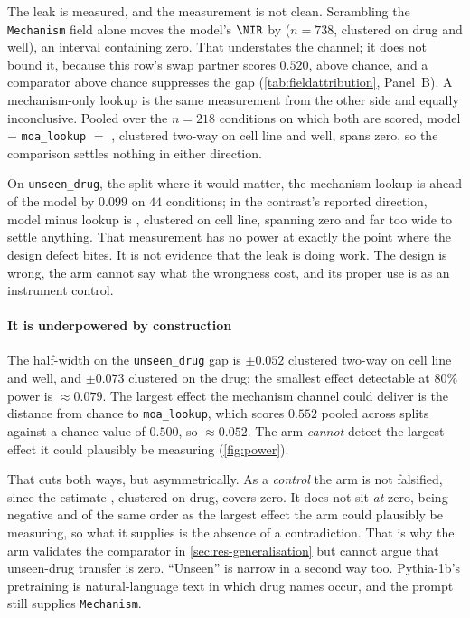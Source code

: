The leak is measured, and the measurement is not clean. Scrambling the
\texttt{Mechanism} field alone moves the model's $\NIR$ by
 ($n = \num{738}$, clustered on drug and well), an
interval containing zero. That understates the channel; it does not bound it,
because this row's swap partner scores $0.520$, above chance, and a comparator
above chance suppresses the gap (\cref{tab:fieldattribution}, Panel~B). A
mechanism-only lookup is the same measurement from the other side and equally
inconclusive. Pooled over the $n = \num{218}$ conditions on which both are
scored, model $-$ \texttt{moa\_lookup} $=$ ,
clustered two-way on cell line and well, spans zero, so the comparison settles
nothing in either direction.

On \texttt{unseen\_drug}, the split where it would matter, the mechanism lookup
is ahead of the model by $0.099$ on $44$ conditions; in the contrast's reported
direction, model minus lookup is , clustered on cell
line, spanning zero and far too wide to settle anything. That measurement has no
power at exactly the point where the design defect bites. It is not evidence
that the leak is doing work. The design is wrong, the arm cannot say what the
wrongness cost, and its proper use is as an instrument control.

\paragraph{It is underpowered by construction} The half-width on the
\texttt{unseen\_drug} gap is $\pm 0.052$ clustered two-way on cell line and
well, and $\pm 0.073$ clustered on the drug; the smallest effect detectable at
$80\%$ power is $\approx 0.079$. The largest effect the mechanism channel could
deliver is the distance from chance to \texttt{moa\_lookup}, which scores
$0.552$ pooled across splits against a chance value of $0.500$, so $\approx
0.052$. The arm \emph{cannot} detect the largest effect it could plausibly be
measuring (\cref{fig:power}).



That cuts both ways, but asymmetrically. As a \emph{control} the arm is not
falsified, since the estimate , clustered on drug,
covers zero. It does not sit \emph{at} zero, being negative and of the same
order as the largest effect the arm could plausibly be measuring, so what it
supplies is the absence of a contradiction. That is why the arm validates the
comparator in \cref{sec:res-generalisation} but cannot argue that unseen-drug
transfer is zero. ``Unseen'' is narrow in a second way too. Pythia-1b's
pretraining is natural-language text in which drug names occur, and the
prompt still supplies \texttt{Mechanism}.

